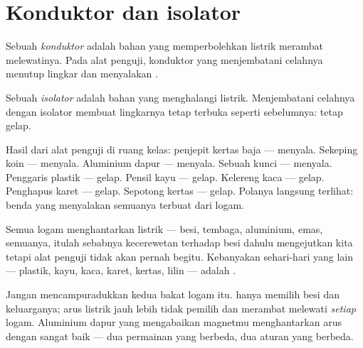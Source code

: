 \section{Konduktor dan isolator}

\begin{definition}[Konduktor]\label{def:g4:conductors-insulators:conductor}
Sebuah \emph{konduktor} adalah bahan yang
memperbolehkan listrik merambat melewatinya. Pada alat penguji,
konduktor yang menjembatani celahnya menutup lingkar dan menyalakan
.
\end{definition}

\begin{definition}[Isolator]\label{def:g4:conductors-insulators:insulator}
Sebuah \emph{isolator} adalah bahan yang menghalangi
listrik. Menjembatani celahnya dengan isolator membuat lingkarnya
tetap terbuka seperti sebelumnya:  tetap gelap.
\end{definition}

\begin{example}\label{ex:g4:conductors-insulators:trials}
Hasil dari alat penguji di ruang kelas: penjepit kertas baja ---
menyala. Sekeping koin --- menyala. Aluminium dapur --- menyala.
Sebuah kunci --- menyala. Penggaris plastik --- gelap. Pensil kayu ---
gelap. Kelereng kaca --- gelap. Penghapus karet --- gelap. Sepotong
kertas --- gelap. Polanya langsung terlihat: benda yang menyalakan
 semuanya terbuat dari logam.
\end{example}

\begin{proposition}\label{prop:g4:conductors-insulators:metals}
Semua logam menghantarkan listrik --- besi, tembaga, aluminium, emas,
semuanya, itulah sebabnya kecerewetan  terhadap besi dahulu
mengejutkan kita tetapi alat penguji tidak akan pernah begitu.
Kebanyakan  sehari-hari yang lain --- plastik, kayu, kaca,
karet, kertas, lilin --- adalah .
\end{proposition}

\begin{remark}\label{rem:g4:conductors-insulators:notmagnet}
Jangan mencampuradukkan kedua bakat logam itu.  hanya memilih
besi dan keluarganya; arus listrik jauh lebih tidak pemilih dan
merambat melewati \emph{setiap} logam. Aluminium dapur yang
mengabaikan magnetmu menghantarkan arus dengan sangat baik --- dua
permainan yang berbeda, dua aturan yang berbeda.
\end{remark}

